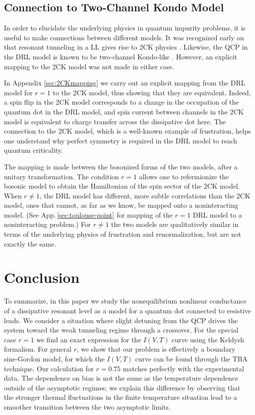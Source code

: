 \documentclass[aps,prb,reprint,floatfix,superscriptaddress,amssymb,amsmath]{revtex4-2}
\begin{document}
\subsection{Connection to Two-Channel Kondo Model}\label{sec:Connection2CK}

In order to elucidate the underlying physics in quantum impurity problems, it is useful to make connections between different models. It was recognized early on that resonant tunneling in a LL gives rise to 2CK physics \cite{EggertAffleck92}. Likewise, the QCP in the DRL model is known to be two-channel Kondo-like \cite{Mebrahtu12,Mebrahtu13,ZhangNoneqPRR21}. However, an explicit mapping to the 2CK model was not made in either case. 

In Appendix \ref{sec:2CKmapping} we carry out an explicit mapping from the DRL model for $r\!=\!1$ to the 2CK model, thus showing that they are equivalent. Indeed, a spin flip in the 2CK model corresponds to a change in the occupation of the quantum dot in the DRL model, and spin current between channels in the 2CK model is equivalent to charge transfer across the dissipative dot here. The connection to the 2CK model, which is a well-known example of frustration, helps one understand why perfect symmetry is required in the DRL model to reach quantum criticality. 

The mapping is made between the bosonized forms of the two models, after a  unitary transformation. The condition  $r\!=\!1$ allows one to refermionize the bosonic model to obtain the Hamiltonian of the spin sector of the 2CK model. When  $r\!\neq\!1$, the DRL model has different, more subtle correlations than the 2CK model, ones that cannot, as far as we know, be mapped onto a noninteracting model. (See App.\,\ref{sec:toulouse-point} for mapping of the $r\!=\!1$ DRL model to a noninteracting problem.) For  $r\!\neq\!1$ the two models are qualitatively similar in terms of the underlying physics of frustration and renormalization, but are not exactly the same. 


\section{Conclusion}\label{sec:Conclusion}

To summarize, in this paper we study the nonequilibrium nonlinear conductance of a dissipative resonant level as a model for a quantum dot connected to resistive leads. 
We consider a situation where slight detuning from the QCP drives the system toward the weak tunneling regime through a crossover. For the special case $r\!=\!1$ we find an exact expression for the $I(V,T)$ curve using the Keldysh formalism. 
For general $r$, we show that our problem is effectively a boundary sine-Gordon model, for which the $I(V,T)$ curve can be found through the TBA technique. Our calculation for $r \!=\! 0.75$ matches perfectly with the experimental data. 
The dependence on bias is not the same as the temperature dependence outside of the asymptotic regimes; we explain this difference by observing that the stronger thermal fluctuations in the finite temperature situation lead to a smoother transition between the two asymptotic limits.
\end{document}
